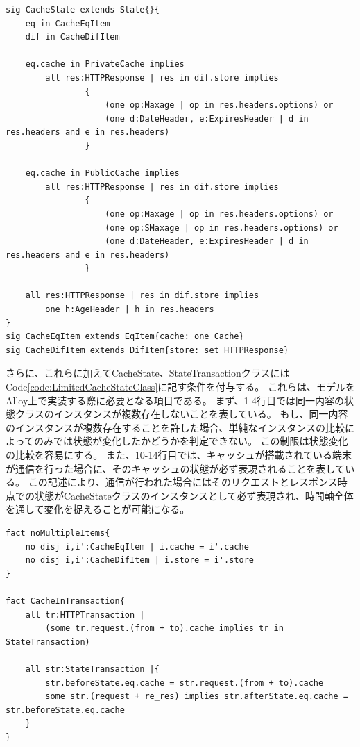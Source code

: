 \documentclass[12pt,a4paper]{jbook}
\begin{document}
\begin{lstlisting}[caption=キャッシュの状態を表すクラス, label=code:CacheStateClass]
sig CacheState extends State{}{
	eq in CacheEqItem
	dif in CacheDifItem

	eq.cache in PrivateCache implies
        all res:HTTPResponse | res in dif.store implies
                {
                    (one op:Maxage | op in res.headers.options) or
                    (one d:DateHeader, e:ExpiresHeader | d in res.headers and e in res.headers)
                }

    eq.cache in PublicCache implies
        all res:HTTPResponse | res in dif.store implies
                {
                    (one op:Maxage | op in res.headers.options) or
                    (one op:SMaxage | op in res.headers.options) or
                    (one d:DateHeader, e:ExpiresHeader | d in res.headers and e in res.headers)
                }

    all res:HTTPResponse | res in dif.store implies
        one h:AgeHeader | h in res.headers
}
sig CacheEqItem extends EqItem{cache: one Cache}
sig CacheDifItem extends DifItem{store: set HTTPResponse}
\end{lstlisting}

\color{red}
さらに、これらに加えてCacheState、StateTransactionクラスにはCode\ref{code:LimitedCacheStateClass}に記す条件を付与する。
これらは、モデルをAlloy上で実装する際に必要となる項目である。
まず、1-4行目では同一内容の状態クラスのインスタンスが複数存在しないことを表している。
もし、同一内容のインスタンスが複数存在することを許した場合、単純なインスタンスの比較によってのみでは状態が変化したかどうかを判定できない。
この制限は状態変化の比較を容易にする。
また、10-14行目では、キャッシュが搭載されている端末が通信を行った場合に、そのキャッシュの状態が必ず表現されることを表している。
この記述により、通信が行われた場合にはそのリクエストとレスポンス時点での状態がCacheStateクラスのインスタンスとして必ず表現され、時間軸全体を通して変化を捉えることが可能になる。
\color{black}
\begin{lstlisting}[caption=CacheStateクラスの制限, label=code:LimitedCacheStateClass]
fact noMultipleItems{
	no disj i,i':CacheEqItem | i.cache = i'.cache
	no disj i,i':CacheDifItem | i.store = i'.store
}

fact CacheInTransaction{
	all tr:HTTPTransaction |
		(some tr.request.(from + to).cache implies tr in StateTransaction)

	all str:StateTransaction |{
		str.beforeState.eq.cache = str.request.(from + to).cache
		some str.(request + re_res) implies str.afterState.eq.cache = str.beforeState.eq.cache
	}
}
\end{lstlisting}
\end{document}
